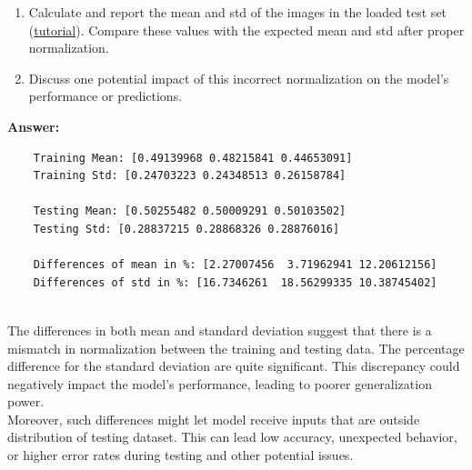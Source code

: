 \documentclass[11pt, oneside]{article}   	%
\begin{document}
\begin{enumerate} \item Calculate and report the mean and std of the images in the loaded test set (\href{https://stackoverflow.com/questions/73350133/how-to-calculate-mean-and-standard-deviation-of-a-set-of-images}{tutorial}). Compare these values with the expected mean and std after proper normalization.

\item Discuss one potential impact of this incorrect normalization on the model's performance or predictions. 

\end{enumerate}
\textbf{Answer:} \\
\begin{verbatim}
    Training Mean: [0.49139968 0.48215841 0.44653091]
    Training Std: [0.24703223 0.24348513 0.26158784]

    Testing Mean: [0.50255482 0.50009291 0.50103502]
    Testing Std: [0.28837215 0.28868326 0.28876016]

    Differences of mean in %: [2.27007456  3.71962941 12.20612156]
    Differences of std in %: [16.7346261  18.56299335 10.38745402]
\end{verbatim}
\\
The differences in both mean and standard deviation suggest that there is a mismatch in normalization between the training and testing data. The percentage difference for the standard deviation are quite significant.
This discrepancy could negatively impact the model's performance, leading to poorer generalization power.
\\
Moreover, such differences might let model receive inputs that are outside distribution of testing dataset. This can lead low accuracy, unexpected behavior, or higher error rates during testing and other potential issues.
\end{document}
